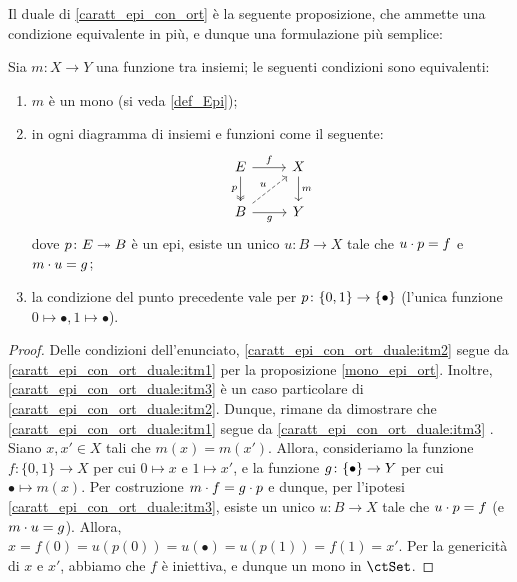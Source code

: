 Il duale di \ref{caratt_epi_con_ort} è la seguente proposizione, che ammette una condizione equivalente in più, e dunque una formulazione più semplice:
\begin{proposition}\label{caratt_epi_con_ort_duale}
 Sia \(m \colon X\to Y\) una funzione tra insiemi; le seguenti condizioni sono equivalenti:
 \begin{enumerate}
  \item\label{caratt_epi_con_ort_duale:itm1} \(m\) è un mono (si veda \ref{def_Epi});
  \item\label{caratt_epi_con_ort_duale:itm2} in ogni diagramma di insiemi e funzioni come il seguente:
        \[\begin{tikzcd}
          E \ar[r, "f"]\ar[d, two heads, "p"']& X \ar[d, "m"]\\
          B \ar[r, "g"'] \ar[ur, dashed, "u"]& Y
         \end{tikzcd}\]
        dove \(p \colon E\twoheadrightarrow B\) è un epi, esiste un unico \(u \colon B\to X\) tale che \(u\cdot p = f\) e \(m\cdot u = g\);
  \item\label{caratt_epi_con_ort_duale:itm3} la condizione del punto precedente vale per \(p \colon \{0,1\} \to \{\bullet\}\) (l'unica funzione \(0\mapsto\bullet, 1\mapsto\bullet\)).
 \end{enumerate}
\end{proposition}
\begin{proof}
 Delle condizioni dell'enunciato, \ref{caratt_epi_con_ort_duale:itm2} segue da \ref{caratt_epi_con_ort_duale:itm1} per la proposizione \ref{mono_epi_ort}.
 Inoltre, \ref{caratt_epi_con_ort_duale:itm3} è un caso particolare di \ref{caratt_epi_con_ort_duale:itm2}.
 Dunque, rimane da dimostrare che \ref{caratt_epi_con_ort_duale:itm1} segue da \ref{caratt_epi_con_ort_duale:itm3} .
 Siano \(x, x' \in X\) tali che \(m(x) = m(x')\).
 Allora, consideriamo la funzione \(f \colon \{0, 1\} \to X\) per cui \(0 \mapsto x\) e \(1 \mapsto x'\),
 e la funzione \(g \colon \{\bullet\} \to Y\) per cui \(\bullet \mapsto m(x)\).
 Per costruzione \(m \cdot f = g \cdot p\) e dunque, per l'ipotesi \ref{caratt_epi_con_ort_duale:itm3}, esiste un unico \(u \colon B\to X\) tale che \(u\cdot p = f\) (e \(m\cdot u = g\)).
 Allora, \(x = f(0) = u(p(0)) = u(\bullet) = u(p(1)) = f(1) = x'\).
 Per la genericità di \(x\) e \(x'\), abbiamo che \(f\) è iniettiva,
 e dunque un mono in \(\ctSet\).
\end{proof}
